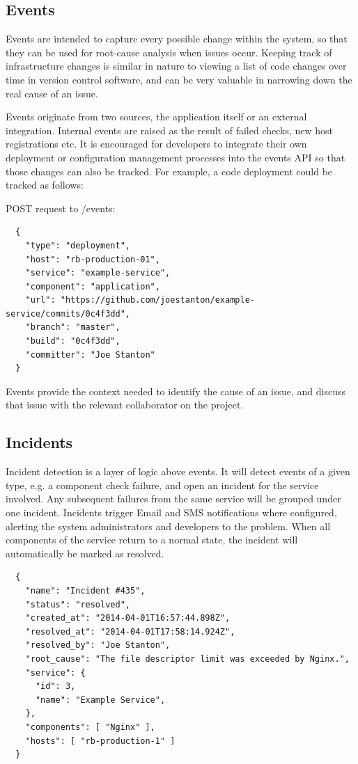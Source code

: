 \documentclass{cshonours}
\begin{document}
\subsection{Events}
Events are intended to capture every possible change within the system, so that they can be used for root-cause analysis when issues occur. Keeping track of infrastructure changes is similar in nature to viewing a list of code changes over time in version control software, and can be very valuable in narrowing down the real cause of an issue.

Events originate from two sources, the application itself or an external integration. Internal events are raised as the result of failed checks, new host registrations etc. It is encouraged for developers to integrate their own deployment or configuration management processes into the events API so that those changes can also be tracked. For example, a code deployment could be tracked as follows:

\begin{listing}[h]
  POST request to /events:
\begin{verbatim}
  {
    "type": "deployment",
    "host": "rb-production-01",
    "service": "example-service",
    "component": "application",
    "url": "https://github.com/joestanton/example-service/commits/0c4f3dd",
    "branch": "master",
    "build": "0c4f3dd",
    "committer": "Joe Stanton"
  }
\end{verbatim}
\end{listing}

Events provide the context needed to identify the cause of an issue, and discuss that issue with the relevant collaborator on the project.

\pagebreak
\subsection{Incidents}

Incident detection is a layer of logic above events. It will detect events of a given type, e.g. a component check failure, and open an incident for the service involved. Any subsequent failures from the same service will be grouped under one incident. Incidents trigger Email and SMS notifications where configured, alerting the system administrators and developers to the problem. When all components of the service return to a normal state, the incident will automatically be marked as resolved.

\begin{listing}[h]
\begin{verbatim}
  {
    "name": "Incident #435",
    "status": "resolved",
    "created_at": "2014-04-01T16:57:44.898Z",
    "resolved_at": "2014-04-01T17:58:14.924Z",
    "resolved_by": "Joe Stanton",
    "root_cause": "The file descriptor limit was exceeded by Nginx.",
    "service": {
      "id": 3,
      "name": "Example Service",
    },
    "components": [ "Nginx" ],
    "hosts": [ "rb-production-1" ]
  }
\end{verbatim}
\end{listing}
\end{document}
